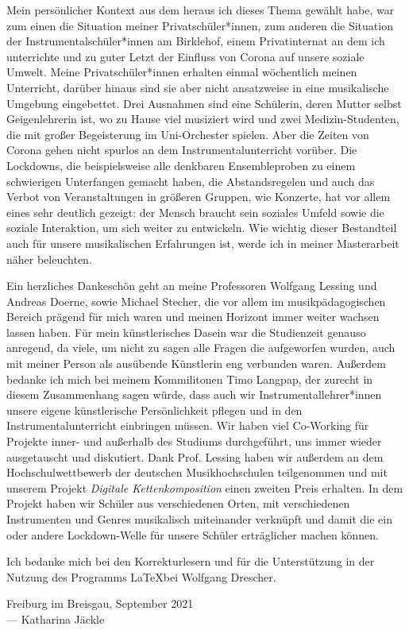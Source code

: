
Mein persönlicher Kontext aus dem heraus ich dieses Thema gewählt habe, war zum
einen die Situation meiner Privatschüler*innen, zum anderen die Situation der
Instrumentalschüler*innen am Birklehof, einem Privatinternat an dem ich
unterrichte und zu guter Letzt der Einfluss von Corona auf unsere soziale
Umwelt. Meine Privatschüler*innen erhalten einmal wöchentlich meinen Unterricht,
darüber hinaus sind sie aber nicht ansatzweise in eine musikalische Umgebung
eingebettet. Drei Ausnahmen sind eine Schülerin, deren Mutter selbst
Geigenlehrerin ist, wo zu Hause viel musiziert wird und zwei Medizin-Studenten,
die mit großer Begeisterung im Uni-Orchester spielen. Aber die Zeiten von Corona
gehen nicht spurlos an dem Instrumentalunterricht vorüber. Die Lockdowns, die
beispielsweise alle denkbaren Ensembleproben zu einem schwierigen Unterfangen
gemacht haben, die Abstandsregelen und auch das Verbot von Veranstaltungen in
größeren Gruppen, wie Konzerte, hat vor allem eines sehr deutlich gezeigt: der
Mensch braucht sein soziales Umfeld sowie die soziale Interaktion, um sich
weiter zu entwickeln. Wie wichtig dieser Bestandteil auch für unsere
musikalischen Erfahrungen ist, werde ich in meiner Masterarbeit näher
beleuchten.

Ein herzliches Dankeschön geht an meine Professoren Wolfgang Lessing und Andreas
Doerne, sowie Michael Stecher, die vor allem im musikpädagogischen Bereich
prägend für mich waren und meinen Horizont immer weiter wachsen lassen haben.
Für mein künstlerisches Dasein war die Studienzeit genauso anregend, da viele,
um nicht zu sagen alle Fragen die aufgeworfen wurden, auch mit meiner Person als
ausübende Künstlerin eng verbunden waren. Außerdem bedanke ich mich bei meinem
Kommilitonen Timo Langpap, der zurecht in diesem Zusammenhang sagen würde, dass
auch wir Instrumentallehrer*innen unsere eigene künstlerische Persönlichkeit
pflegen und in den Instrumentalunterricht einbringen müssen. Wir haben viel
Co-Working für Projekte inner- und außerhalb des Studiums durchgeführt, uns
immer wieder ausgetauscht und diskutiert. Dank Prof. Lessing haben wir außerdem
an dem Hochschulwettbewerb der deutschen Musikhochschulen teilgenommen und mit
unserem Projekt \emph{Digitale Kettenkomposition} einen zweiten Preis erhalten.
In dem Projekt haben wir Schüler aus verschiedenen Orten, mit verschiedenen
Instrumenten und Genres musikalisch miteinander verknüpft und damit die ein oder
andere Lockdown-Welle für unsere Schüler erträglicher machen können. 

Ich bedanke mich bei den Korrekturlesern und für die Unterstützung in der
Nutzung des Programms \LaTeX bei Wolfgang Drescher.




\vspace{0.5cm}

\begin{flushright}
	{
		\small
		Freiburg im Breisgau, September 2021\\
		--- Katharina Jäckle }
\end{flushright}
